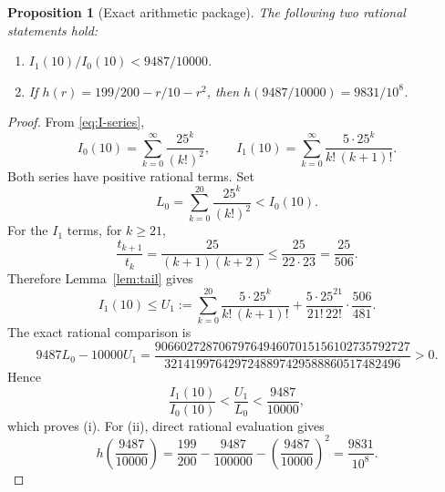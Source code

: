 \documentclass[preprint,12pt]{elsarticle}
\theoremstyle{plain}
\newtheorem{proposition}[theorem]{Proposition}
\theoremstyle{definition}
\theoremstyle{remark}
\begin{document}
\begin{proposition}[Exact arithmetic package]\label{prop:certificate-arithmetic}
The following two rational statements hold:
\begin{enumerate}[label=\textup{(\roman*)},leftmargin=2.3em]
\item \(I_1(10)/I_0(10)<9487/10000\).
\item If \(h(r)=199/200-r/10-r^2\), then
\(h(9487/10000)=9831/10^8\).
\end{enumerate}
\end{proposition}
\begin{proof}
From \eqref{eq:I-series},
\begin{equation}\label{eq:appendix-bessel-series}
I_0(10)=\sum_{k=0}^{\infty}\frac{25^k}{(k!)^2},
\qquad
I_1(10)=\sum_{k=0}^{\infty}\frac{5\cdot25^k}{k!\,(k+1)!}.
\end{equation}
Both series have positive rational terms. Set
\begin{equation}\label{eq:appendix-L0}
L_0=\sum_{k=0}^{20}\frac{25^k}{(k!)^2}<I_0(10).
\end{equation}
For the \(I_1\) terms, for \(k\ge21\),
\begin{equation}\label{eq:appendix-tail-ratio}
\frac{t_{k+1}}{t_k}
=\frac{25}{(k+1)(k+2)}
\le \frac{25}{22\cdot23}
=\frac{25}{506}.
\end{equation}
Therefore Lemma~\ref{lem:tail} gives
\begin{equation}\label{eq:appendix-U1}
I_1(10)\le U_1:=
\sum_{k=0}^{20}\frac{5\cdot25^k}{k!\,(k+1)!}
+\frac{5\cdot25^{21}}{21!\,22!}\cdot\frac{506}{481}.
\end{equation}
The exact rational comparison is
\begin{equation}\label{eq:appendix-integer-witness}
9487L_0-10000U_1
=
\frac{9066027287067976494607015156102735792727}
{3214199764297248897429588860517482496}>0.
\end{equation}
Hence
\begin{equation}\label{eq:appendix-ratio-certificate}
\frac{I_1(10)}{I_0(10)}
<\frac{U_1}{L_0}
<\frac{9487}{10000},
\end{equation}
which proves (i). For (ii), direct rational evaluation gives
\begin{equation}\label{eq:appendix-h-value}
h\!\left(\frac{9487}{10000}\right)
=\frac{199}{200}-\frac{9487}{100000}
-\left(\frac{9487}{10000}\right)^2
=\frac{9831}{10^8}.
\end{equation}
\end{proof}
\end{document}
